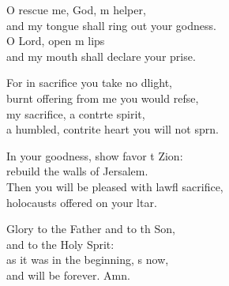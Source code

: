\begin{psalmverse}
\begin{patverse}
O rescue me, God, m helper,\Med\\
and my tongue shall ring out your godness.\\
O Lord, open m lips\Med\\
and my mouth shall declare your prise.

For in sacrifice you take no dlight,\Med\\
burnt offering from me you would refse,\\
my sacrifice, a contr\pointup{\i}te spirit,\Med\\
a humbled, contrite heart you will not sprn.

In your goodness, show favor t Zion:\Med\\
rebuild the walls of Jersalem.\\
Then you will be pleased with lawfl sacrifice,\Med\\
holocausts offered on your ltar.

Glory to the Father and to th Son,\Med\\
and to the Holy Sp\pointup{\i}rit:\\
as it was in the beginning, \pointup{\i}s now,\Med\\
and will be forever. Amn.
  \end{patverse}
\end{psalmverse}
